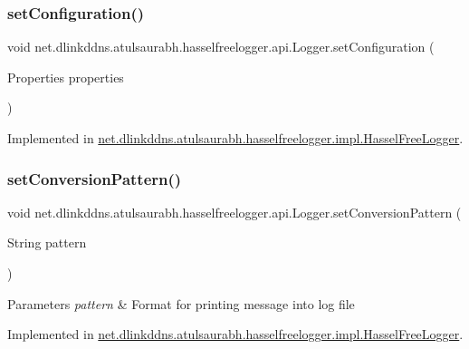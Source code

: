 \subsubsection{\texorpdfstring{set\+Configuration()}{setConfiguration()}}
{\footnotesize\ttfamily void net.\+dlinkddns.\+atulsaurabh.\+hasselfreelogger.\+api.\+Logger.\+set\+Configuration (\begin{DoxyParamCaption}\item[{Properties}]{properties }\end{DoxyParamCaption})}



Implemented in \mbox{\hyperlink{classnet_1_1dlinkddns_1_1atulsaurabh_1_1hasselfreelogger_1_1impl_1_1_hassel_free_logger_a9dbc7356642960679aaa76cc054ce456}{net.\+dlinkddns.\+atulsaurabh.\+hasselfreelogger.\+impl.\+Hassel\+Free\+Logger}}.

\mbox{\label{interfacenet_1_1dlinkddns_1_1atulsaurabh_1_1hasselfreelogger_1_1api_1_1_logger_a5a1b9dac86c15782309e01d5327e4299}} 
\subsubsection{\texorpdfstring{set\+Conversion\+Pattern()}{setConversionPattern()}}
{\footnotesize\ttfamily void net.\+dlinkddns.\+atulsaurabh.\+hasselfreelogger.\+api.\+Logger.\+set\+Conversion\+Pattern (\begin{DoxyParamCaption}\item[{String}]{pattern }\end{DoxyParamCaption})}


\begin{DoxyParams}{Parameters}
{\em pattern} & Format for printing message into log file \\
\hline
\end{DoxyParams}


Implemented in \mbox{\hyperlink{classnet_1_1dlinkddns_1_1atulsaurabh_1_1hasselfreelogger_1_1impl_1_1_hassel_free_logger_a23a1e3b5c56528e197c7eb3832e7c69e}{net.\+dlinkddns.\+atulsaurabh.\+hasselfreelogger.\+impl.\+Hassel\+Free\+Logger}}.

